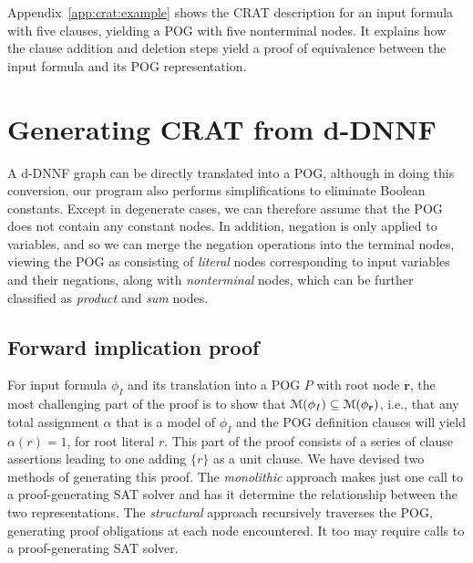\documentclass[letterpaper,USenglish,cleveref, autoref, thm-restate]{lipics-v2021}
\newcommand{\assign}{\alpha}
\newcommand{\modelset}{{\cal M}}
\newcommand{\inputformula}{\phi_I}
\newcommand{\makenode}[1]{\mathbf{#1}}
\newcommand{\noder}{\makenode{r}}
\newcommand{\progname}[1]{\textsc{#1}}
\newcommand{\dfour}{\progname{D4}}
\begin{document}
Appendix~\ref{app:crat:example} shows the CRAT description for
an input formula with five clauses, yielding a POG with five
nonterminal nodes.  It explains how the clause addition and deletion
steps yield a proof of equivalence between the input formula and its POG
representation.

\section{Generating CRAT from d-DNNF}
\label{section:generating:crat}

A d-DNNF
graph can be directly translated  into a POG,
although in doing this conversion,
our program also performs simplifications to
eliminate Boolean constants.
Except in degenerate cases,
we can therefore assume
that the POG does not contain any constant nodes.
In addition, negation is only
applied to variables, and so we can merge the negation operations into the terminal nodes,
viewing the POG as consisting
of {\em literal} nodes corresponding to input variables and their negations, along with
{\em nonterminal} nodes, which can be further classified as {\em product} and {\em sum} nodes.

\subsection{Forward implication proof}

For input formula $\inputformula$ and its translation into a POG $P$
with root node $\noder$, the most challenging part of the proof is to
show that $\modelset(\inputformula) \subseteq \modelset(\phi_\noder)$, i.e.,
that any total assignment $\assign$ that is a model of $\inputformula$
and the POG definition clauses
will yield $\assign(r) = 1$, for root literal $r$.  This part of the
proof consists of a series of clause assertions leading to one adding
$\{r\}$ as a unit clause.  We have devised two methods of generating this
proof.  The {\em monolithic} approach makes just one call to a
proof-generating SAT solver and has it determine the relationship
between the two representations.  The {\em structural} approach
recursively traverses the POG, generating proof obligations at each
node encountered.  It too may require calls to a proof-generating SAT
solver.
\end{document}
